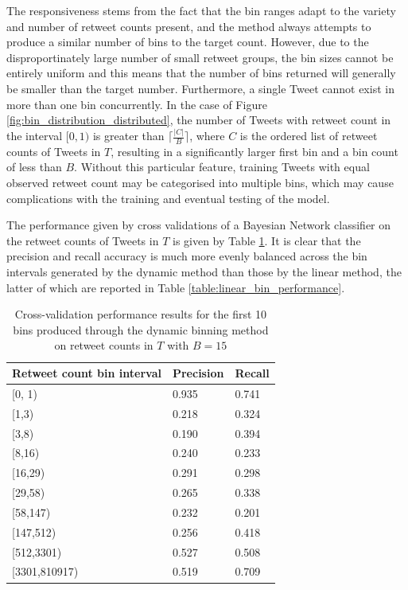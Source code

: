 The responsiveness stems from the fact that the bin ranges adapt to the variety and number of retweet counts present, and the method always attempts to produce a similar number of bins to the target count. However, due to the disproportinately large number of small retweet groups, the bin sizes cannot be entirely uniform and this means that the number of bins returned will generally be smaller than the target number. Furthermore, a single Tweet cannot exist in more than one bin concurrently. In the case of Figure \ref{fig:bin_distribution_distributed}, the number of Tweets with retweet count in the interval $[0,1)$ is greater than $\lceil\frac{|C|}{B}\rceil$, where $C$ is the ordered list of retweet counts of Tweets in $T$, resulting in a significantly larger first bin and a bin count of less than $B$. Without this particular feature, training Tweets with equal observed retweet count may be categorised into multiple bins, which may cause complications with the training and eventual testing of the model. 

The performance given by cross validations of a Bayesian Network classifier on the retweet counts of Tweets in $T$ is given by Table \ref{table:distributed_bin_performance}. It is clear that the precision and recall accuracy is much more evenly balanced across the bin intervals generated by the dynamic method than those by the linear method, the latter of which are reported in Table \ref{table:linear_bin_performance}.

\begin{table}[h]\footnotesize
\begin{center}
\begin{tabular}{ l | l | l }
	Retweet count bin interval	& Precision & Recall \\
	\hline
	\hline 
    {[0, 1)}           &    0.935   &   0.741\\
    {[1,3)}             &   0.218   &   0.324\\
    {[3,8)}             &   0.190    &   0.394\\
    {[8,16)}            &   0.240   &   0.233\\
    {[16,29)}           &   0.291   &   0.298\\
    {[29,58)}           &   0.265   &   0.338\\
    {[58,147)}          &   0.232   &   0.201\\
    {[147,512)}         &   0.256   &   0.418\\
    {[512,3301)}        &   0.527   &   0.508\\
    {[3301,810917)}     &   0.519   &   0.709\\
    \hline  
\end{tabular}
\end{center}
\caption{Cross-validation performance results for the first 10 bins produced through the dynamic binning method on retweet counts in $T$ with $B=15$}
\label{table:distributed_bin_performance}
\end{table}

